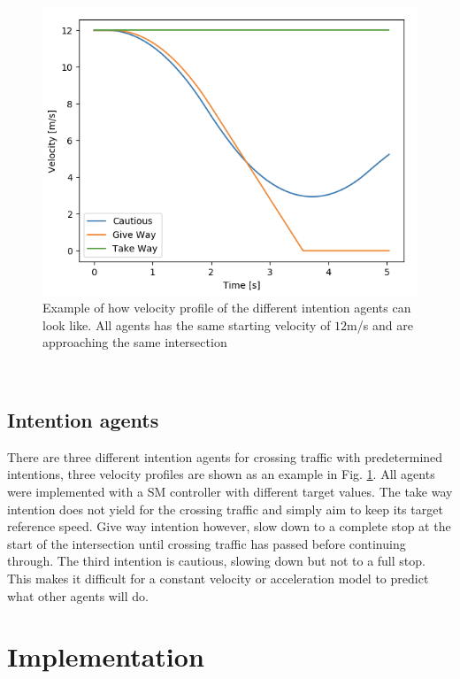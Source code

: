 \begin{figure}[t!]
	\centering
	\vspace{0.3cm}
	\includegraphics[width=0.7\columnwidth]{figures/velocity_profiles_agents.png}
	\caption{Example of how velocity profile of the different intention agents can look like. All agents has the same starting velocity of $12$m/s and are approaching the same intersection}
	\label{fig:intention_profiles}
	\vspace{-0.3cm}
\end{figure}\
\subsection{Intention agents}

There are three different intention agents for crossing traffic with predetermined intentions, three velocity profiles are shown as an example in Fig. \ref{fig:intention_profiles}. All agents were implemented with a SM controller with different target values. The take way intention does not yield for the crossing traffic and simply aim to keep its target reference speed. Give way intention however, slow down to a complete stop at the start of the intersection until crossing traffic has passed before continuing through. The third intention is cautious, slowing down but not to a full stop. This makes it difficult for a constant velocity or acceleration model to predict what other agents will do.
\section{Implementation}\label{sec:implementation}

